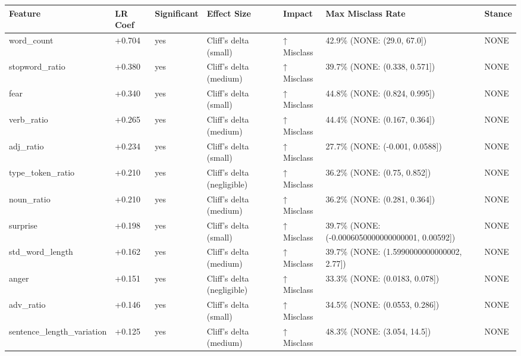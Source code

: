 \begin{tabular}{lllllll}
\toprule
Feature & LR Coef & Significant & Effect Size & Impact & Max Misclass Rate & Stance \\
\midrule
word\_count & +0.704 & yes & Cliff's delta (small) & ↑ Misclass & 42.9\% (NONE: (29.0, 67.0]) & NONE \\
stopword\_ratio & +0.380 & yes & Cliff's delta (medium) & ↑ Misclass & 39.7\% (NONE: (0.338, 0.571]) & NONE \\
fear & +0.340 & yes & Cliff's delta (small) & ↑ Misclass & 44.8\% (NONE: (0.824, 0.995]) & NONE \\
verb\_ratio & +0.265 & yes & Cliff's delta (medium) & ↑ Misclass & 44.4\% (NONE: (0.167, 0.364]) & NONE \\
adj\_ratio & +0.234 & yes & Cliff's delta (small) & ↑ Misclass & 27.7\% (NONE: (-0.001, 0.0588]) & NONE \\
type\_token\_ratio & +0.210 & yes & Cliff's delta (negligible) & ↑ Misclass & 36.2\% (NONE: (0.75, 0.852]) & NONE \\
noun\_ratio & +0.210 & yes & Cliff's delta (medium) & ↑ Misclass & 36.2\% (NONE: (0.281, 0.364]) & NONE \\
surprise & +0.198 & yes & Cliff's delta (small) & ↑ Misclass & 39.7\% (NONE: (-0.0006050000000000001, 0.00592]) & NONE \\
std\_word\_length & +0.162 & yes & Cliff's delta (medium) & ↑ Misclass & 39.7\% (NONE: (1.5990000000000002, 2.77]) & NONE \\
anger & +0.151 & yes & Cliff's delta (negligible) & ↑ Misclass & 33.3\% (NONE: (0.0183, 0.078]) & NONE \\
adv\_ratio & +0.146 & yes & Cliff's delta (small) & ↑ Misclass & 34.5\% (NONE: (0.0553, 0.286]) & NONE \\
sentence\_length\_variation & +0.125 & yes & Cliff's delta (medium) & ↑ Misclass & 48.3\% (NONE: (3.054, 14.5]) & NONE \\
\bottomrule
\end{tabular}
